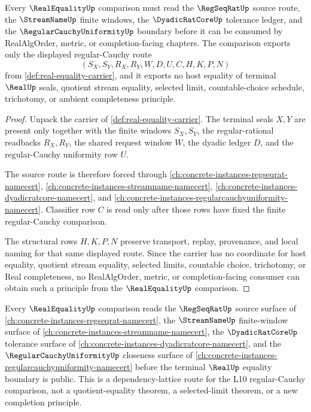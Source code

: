 \begin{theorem}
\label{thm:real-equality-regular-cauchy-source-route}
Every $\RealEqualityUp$ comparison must read the $\RegSeqRatUp$ source route, the $\StreamNameUp$ finite windows, the $\DyadicRatCoreUp$ tolerance ledger, and the $\RegularCauchyUniformityUp$ boundary before it can be consumed by RealAlgOrder, metric, or completion-facing chapters. The comparison exports only the displayed regular-Cauchy route
$$
(S_X,S_Y,R_X,R_Y,W,D,U,C,H,K,P,N)
$$
from \autoref{def:real-equality-carrier}, and it exports no host equality of terminal $\RealUp$ seals, quotient stream equality, selected limit, countable-choice schedule, trichotomy, or ambient completeness principle.
\end{theorem}
\begin{proof}
Unpack the carrier of \autoref{def:real-equality-carrier}. The terminal seals $X,Y$ are present only together with the finite windows $S_X,S_Y$, the regular-rational readbacks $R_X,R_Y$, the shared request window $W$, the dyadic ledger $D$, and the regular-Cauchy uniformity row $U$.

The source route is therefore forced through \autoref{ch:concrete-instances-regseqrat-namecert}, \autoref{ch:concrete-instances-streamname-namecert}, \autoref{ch:concrete-instances-dyadicratcore-namecert}, and \autoref{ch:concrete-instances-regularcauchyuniformity-namecert}. Classifier row $C$ is read only after those rows have fixed the finite regular-Cauchy comparison.

The structural rows $H,K,P,N$ preserve transport, replay, provenance, and local naming for that same displayed route. Since the carrier has no coordinate for host equality, quotient stream equality, selected limits, countable choice, trichotomy, or Real completeness, no RealAlgOrder, metric, or completion-facing consumer can obtain such a principle from the $\RealEqualityUp$ comparison.
\end{proof}

\begin{proposition}
\label{prop:real-equality-regseqrat-dependency-route}
Every $\RealEqualityUp$ comparison reads the $\RegSeqRatUp$ source surface of \autoref{ch:concrete-instances-regseqrat-namecert}, the $\StreamNameUp$ finite-window surface of \autoref{ch:concrete-instances-streamname-namecert}, the $\DyadicRatCoreUp$ tolerance surface of \autoref{ch:concrete-instances-dyadicratcore-namecert}, and the $\RegularCauchyUniformityUp$ closeness surface of \autoref{ch:concrete-instances-regularcauchyuniformity-namecert} before the terminal $\RealUp$ equality boundary is public. This is a dependency-lattice route for the L10 regular-Cauchy comparison, not a quotient-equality theorem, a selected-limit theorem, or a new completion principle.
\end{proposition}

